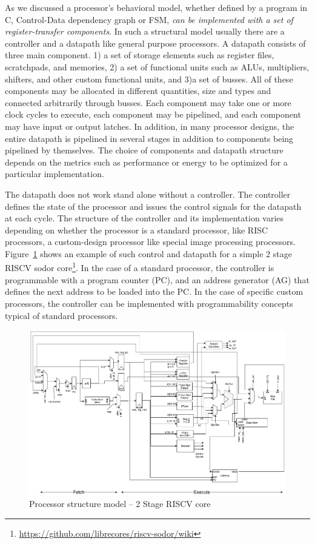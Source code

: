 As we discussed a processor’s behavioral model, whether defined by a program in C, Control-Data dependency graph or FSM, \emph{can be implemented with a set of register-transfer components}.
In such a structural model usually there are a controller and a datapath like general purpose processors.
A datapath consists of three main component. 1) a set of storage elements such as register files, scratchpads, and memories, 2) a set of functional units such as ALUs, multipliers, shifters, and other custom functional units, and 3)a set of busses.
All of these components may be allocated in different quantities, size and types and connected arbitrarily through busses.
Each component may take one or more clock cycles to execute, each component may be pipelined, and each component may have input or output latches.
In addition, in many processor designs, the entire datapath is pipelined in several stages in addition to components being pipelined by themselves.
The choice of components and datapath structure depends on the metrics such as performance or energy to be optimized for a particular implementation.

The datapath does not work stand alone without a controller.
The controller defines the state of the processor and issues the control signals for the datapath at each cycle.
The structure of the controller and its implementation varies depending on whether the processor is a standard processor, like RISC processors, a custom-design processor like special image processing processors. 
Figure~\ref{fig:proc_structure} shows an example of such control and datapath for a simple 2 stage RISCV sodor core\footnote{\url{https://github.com/librecores/riscv-sodor/wiki}}.
In the case of a standard processor, the controller is programmable with a program counter (PC), and an address generator (AG) that defines the next address to be loaded into the PC.
In the case of specific custom processors, the controller can be implemented with programmability concepts typical of standard processors.



\begin{figure}[!t]
    \centering
    \includegraphics[width=\textwidth]{figures/Introduction/2stage.pdf}
    \caption{Processor structure model -- 2 Stage RISCV core}
    \label{fig:proc_structure}
\end{figure}


